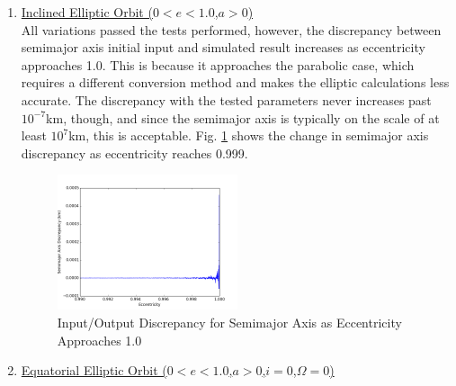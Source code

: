 \begin{itemize}
	\begin{enumerate}
		\item \underline{Inclined Elliptic Orbit ($0<e<1.0$,\quad $a>0$)}\\
		All variations passed the tests performed, however, the discrepancy between semimajor axis initial input and simulated result increases as eccentricity approaches 1.0. This is because it approaches the parabolic case, which requires a different conversion method and makes the elliptic calculations less accurate. The discrepancy with the tested parameters never increases past $10^{-7}$km, though, and since the semimajor axis is typically on the scale of at least $10^7$km, this is acceptable. Fig. \ref{fig:aDiff} shows the change in semimajor axis discrepancy as eccentricity reaches 0.999. %
		\begin{figure} [H]
			\centering
			\includegraphics[width=0.5\textwidth]{Figures/aDiff.png}
			\caption{Input/Output Discrepancy for Semimajor Axis as Eccentricity Approaches 1.0}\label{fig:aDiff}
		\end{figure}
		\item \underline{Equatorial Elliptic Orbit ($0<e<1.0$,\quad $a>0$,\quad $i=0$,\quad $\Omega=0$)}\\

\end{enumerate}
\end{itemize}
